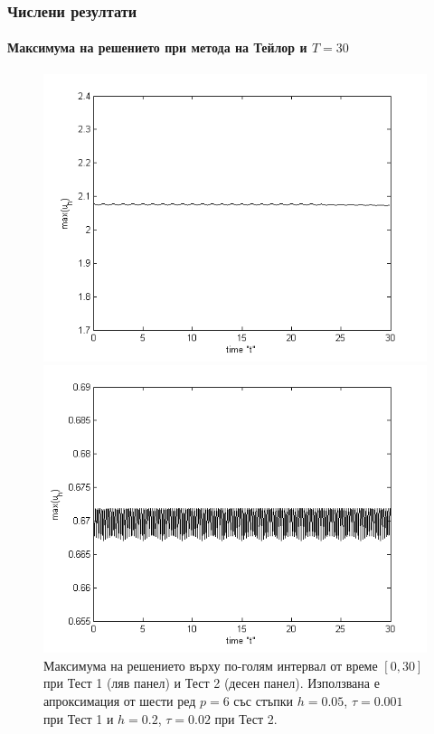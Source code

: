 \documentclass{beamer}
\begin{document}

\begin{frame}
\frametitle{Числени резултати}
\framesubtitle{Максимума на решението при метода на Тейлор и $T=30$}

\begin{figure}[ht]
	\centering
	\begin{minipage}[b]{0.40\linewidth}
		\includegraphics[width=\linewidth]{../amitans/figures/maximum_30_T30_bt3_c045_h005.png}
	\end{minipage}	
	\begin{minipage}[b]{0.40\linewidth}
		 \includegraphics[width=\linewidth]{../amitans/figures/maximum_30_T30_bt1_c090_h020.png}
	\end{minipage}
\caption{Максимума на решението върху по-голям интервал от време $[0, 30]$ при Тест 1 (ляв панел) и Тест 2 (десен панел). Използвана е апроксимация от шести ред $p=6$ със стъпки $h=0.05$, $\tau = 0.001$ при Тест 1 и $h=0.2$,  $\tau=0.02$ при Тест 2.}
\end{figure}

\end{frame}
\end{document}
